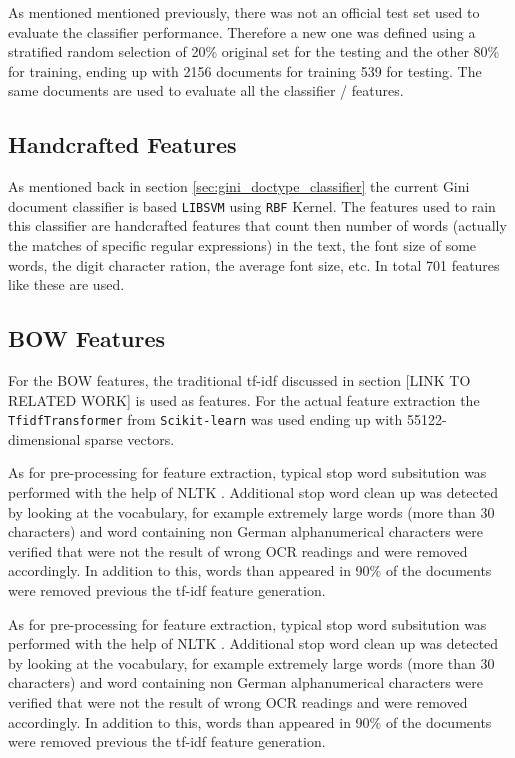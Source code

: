 As mentioned mentioned previously, there was not an official test set used to
evaluate the classifier performance. Therefore a new one was defined using a
stratified random selection of 20\% original  set for the testing and the
other 80\% for training, ending up with 2156 documents for training  539 for
testing. The same documents are used to evaluate all the classifier /
features.


\subsection{Handcrafted Features}
\label{sec:sub_w2v4tc_current_features}

As mentioned back in section  \ref{sec:gini_doctype_classifier} the current
Gini document classifier is based  \texttt{LIBSVM} \cite{CC01a} using 
\texttt{RBF} Kernel.   The features used to rain this classifier are
handcrafted features that count then number of words (actually the matches of
specific regular expressions) in the text, the font size of some
words, the digit character ration, the average font size, etc. In total 701 features like these are used.
 

\subsection{\ac{BOW} Features}
\label{sec:sub_w2v4tc_bow_features}

For the \ac{BOW} features, the traditional \ac{tf-idf}  
\cite{Salton88term-weightingapproaches}\cite{Sebastiani02} discussed in
section [LINK TO RELATED WORK] is used as features. For the actual feature
extraction the \texttt{TfidfTransformer} from \texttt{Scikit-learn}
\cite{scikit-learn}  was used ending up with 55122-dimensional sparse
vectors.

As for  pre-processing for feature extraction,  typical stop word subsitution was performed with the help
of \ac{NLTK} \cite{BirdKleinLoper09}. Additional stop word clean up was
detected by looking at the vocabulary, for example extremely large words
(more than 30 characters) and word containing non German alphanumerical
characters were verified that were not the result of wrong OCR
readings and were removed accordingly. In addition to this, words than
appeared in 90\% of the documents were removed  previous the \ac{tf-idf}
feature generation.


As for  pre-processing for feature extraction,  typical stop word subsitution was performed with the help
of \ac{NLTK} \cite{BirdKleinLoper09}. Additional stop word clean up was
detected by looking at the vocabulary, for example extremely large words
(more than 30 characters) and word containing non German alphanumerical
characters were verified that were not the result of wrong OCR
readings and were removed accordingly. In addition to this, words than
appeared in 90\% of the documents were removed  previous the \ac{tf-idf}
feature generation.



